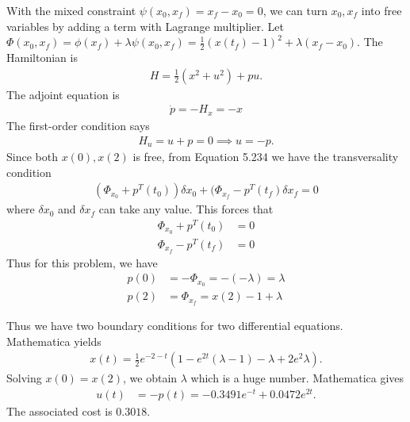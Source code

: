 \documentclass[12pt]{article}
\begin{document}
\begin{problem}[3]
With the mixed constraint $ \psi(x_0,x_f) = x_f - x_0 = 0$, we can turn $ x_0,x_f$ into free variables by adding a term with Lagrange multiplier. Let $ \Phi(x_0,x_f) = \phi(x_f) + \lambda \psi(x_0,x_f)= \frac{1}{2}(x(t_f)-1)^2 + \lambda(x_f - x_0)$. The Hamiltonian is
\begin{align*}
	H = \frac{1}{2} (x^2+u^2)+pu .
\end{align*}
The adjoint equation is
\begin{align*}
	\dot{p}= -H_x = -x
\end{align*}
The first-order condition says
\begin{align*}
	H_u = u +p=0 \implies u = -p .
\end{align*}
Since both $x(0), x(2)$ is free, from Equation 5.234 we have the transversality condition
 \begin{align*}
	 (\Phi_{x_0}+p ^{T}(t_0)) \delta x_0 + (\Phi_{x_f}- p ^{T}(t_f)	\delta x_f = 0
\end{align*}
where $ \delta x_0$ and $ \delta x_f$ can take any value. This forces that
\begin{align*}
	\Phi_{x_0} + p ^{T}(t_0) &=0 \\
	\Phi_{x_f} - p ^{T}(t_f) &= 0 
\end{align*}
Thus for this problem, we have
\begin{align*}
	p(0) &= -\Phi_{x_0} = -(- \lambda ) = \lambda\\
	p(2) &= \Phi_{x_f} = x(2) -1 + \lambda  
\end{align*}

Thus we have two boundary conditions for two differential equations. Mathematica yields
\begin{align*}
	x(t) = \frac{1}{2} e^{-2-t} \left( 1-e^{2t}(\lambda-1) - \lambda + 2e^2 \lambda \right) .
\end{align*}
Solving $ x(0) = x(2)$, we obtain  $ \lambda$ which is a huge number. Mathematica gives
\begin{align*}
	u(t) &= -p(t) = -0.3491 e^{-t} + 0.0472 e^{2t}.
\end{align*}
The associated cost is $ 0.3018$.
\end{problem}
\end{document}
